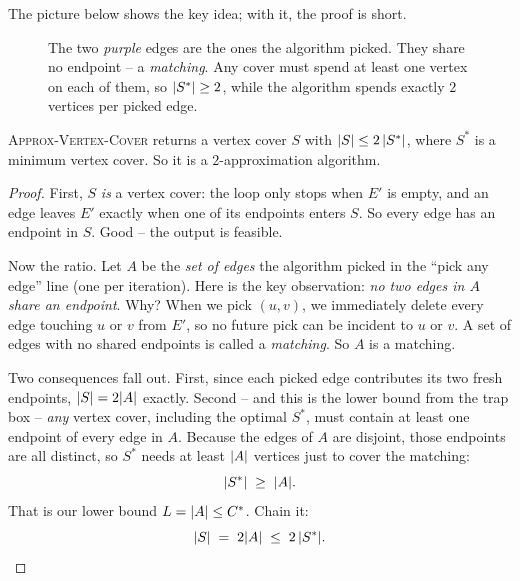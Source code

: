 The picture below shows the key idea; with it, the proof is short.

\begin{figure}[h]
\centering
{}
\caption{The two \emph{purple} edges are the ones the algorithm picked.
They share no endpoint -- a \emph{matching}. Any cover must spend at least
one vertex on each of them, so $\lvert S^{*}\rvert \ge 2$, while the algorithm spends
exactly $2$ vertices per picked edge.}
\label{ch34:vc-matching}
\end{figure}

\begin{theorem}
\label{ch34:vc-thm}
\textsc{Approx-Vertex-Cover} returns a vertex cover $S$ with
$\lvert S\rvert \le 2\,\lvert S^{*}\rvert$, where $S^{*}$ is a minimum vertex cover. So it
is a $2$-approximation algorithm.
\end{theorem}

\begin{proof}
First, $S$ \emph{is} a vertex cover: the loop only stops when $E'$ is empty,
and an edge leaves $E'$ exactly when one of its endpoints enters $S$. So every
edge has an endpoint in $S$. Good -- the output is feasible.

Now the ratio. Let $A$ be the \emph{set of edges} the algorithm picked in the
``pick any edge'' line (one per iteration). Here is the key observation:
\emph{no two edges in $A$ share an endpoint}. Why? When we pick $(u,v)$, we
immediately delete every edge touching $u$ or $v$ from $E'$, so no future
pick can be incident to $u$ or $v$. A set of edges with no shared endpoints is
called a \emph{matching}. So $A$ is a matching.

Two consequences fall out. First, since each picked edge contributes its two
fresh endpoints, $\lvert S\rvert = 2\lvert A\rvert$ exactly. Second -- and this is the lower
bound from the trap box -- \emph{any} vertex cover, including the optimal
$S^{*}$, must contain at least one endpoint of every edge in $A$. Because the
edges of $A$ are disjoint, those endpoints are all distinct, so $S^{*}$ needs
at least $\lvert A\rvert$ vertices just to cover the matching:
\[
\lvert S^{*}\rvert \;\ge\; \lvert A\rvert.
\]
That is our lower bound $L = \lvert A\rvert \le C^{*}$. Chain it:
\[
\lvert S\rvert \;=\; 2\lvert A\rvert \;\le\; 2\,\lvert S^{*}\rvert. \qedhere
\]
\end{proof}

